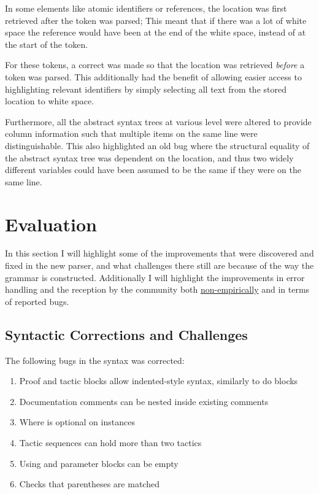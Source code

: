 \documentclass[a4paper]{article}%
\begin{document}
In some elements like atomic identifiers or references, the location was first retrieved after the token was parsed; This meant that if there was a lot of white space the reference would have been at the end
of the white space, instead of at the start of the token.

For these tokens, a correct was made so that the location was retrieved \textit{before} a token was parsed.
This additionally had the benefit of allowing easier access to highlighting relevant identifiers by simply selecting all text from the stored location to white space.

Furthermore, all the abstract syntax trees at various level were altered to provide column information such that multiple items on the same line were distinguishable.
This also highlighted an old bug where the structural equality of the abstract syntax tree was dependent on the location, and thus two widely different variables could have been assumed to be the same if they were on the same line.

\section{Evaluation}
\label{sec:Evaluation}
In this section I will highlight some of the improvements that were discovered and fixed in the new parser, and what challenges there still are because of the way the grammar is constructed.
Additionally I will highlight the improvements in error handling and the reception by the community both \underline{non-empirically} and in terms of reported bugs.

\subsection{Syntactic Corrections and Challenges}
\label{sub:SyntacticCorrectionsandChallenges}
The following bugs in the syntax was corrected:
\begin{enumerate}
  \item Proof and tactic blocks allow indented-style syntax, similarly to do blocks
  \item Documentation comments can be nested inside existing comments
  \item Where is optional on instances
  \item Tactic sequences can hold more than two tactics
  \item Using and parameter blocks can be empty
  \item Checks that parentheses are matched
\end{enumerate}
\end{document}
